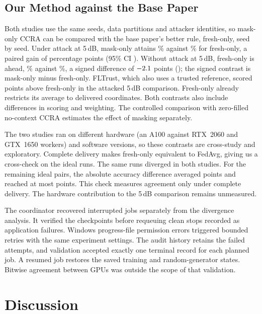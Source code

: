 \subsection{Our Method against the Base Paper}
\label{sec:vs-bp}
Both studies use the same seeds, data partitions and attacker identities, so mask-only
CCRA can be compared with the base paper's better rule, fresh-only, seed by seed. Under
attack at 5\,dB, mask-only attains \AccMaskStress\% against \BpAttackStressFresh\% for
fresh-only, a paired gain of \VsBpAttack{} percentage points (95\% CI
\ci{\VsBpAttackLo}{\VsBpAttackHi}). Without attack at 5\,dB, fresh-only is ahead,
\BpCleanStressFresh\% against \AccMaskCleanStress\%, a signed difference of $-2.1$ points
(\ci{\VsBpCleanLo}{\VsBpCleanHi}); the signed contrast is mask-only minus fresh-only.
FLTrust, which also uses a trusted reference, scored \FltVsBpAttack{} points
above fresh-only in the attacked 5\,dB comparison. Fresh-only already restricts
its average to delivered coordinates. Both contrasts also include differences
in scoring and weighting. The controlled comparison with zero-filled no-context
CCRA estimates the effect of masking separately.

The two studies ran on different hardware (an A100 against RTX~2060 and GTX~1650
workers) and software versions, so these contrasts are cross-study and exploratory.
Complete delivery makes fresh-only equivalent to FedAvg, giving us a cross-check
on the ideal runs. The same runs diverged in both studies. For the \XcheckRuns{}
remaining ideal pairs, the absolute accuracy difference averaged \XcheckMean{}
points and reached at most \XcheckMax{} points. This check measures agreement only
under complete delivery. The hardware contribution to the 5\,dB comparison
remains unmeasured.

The coordinator recovered interrupted jobs separately from the divergence analysis.
It verified the checkpoints before requeuing clean stops recorded as application
failures. Windows progress-file permission errors triggered bounded retries with
the same experiment settings. The audit history retains the failed attempts, and
validation accepted exactly one terminal record for each planned job. A resumed job
restores the saved training and random-generator states. Bitwise agreement between
GPUs was outside the scope of that validation.

\section{Discussion}

